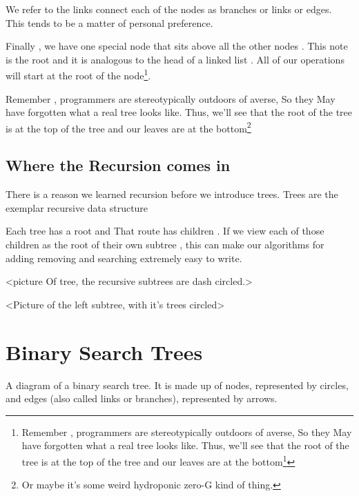 \documentclass[10pt,a4paper]{book}
\begin{document}
We refer to the links connect each of the nodes as branches or links or edges.  This tends to be a matter of personal preference.



Finally , we have one special node that sits above all the other nodes . This note is the root and it is analogous to the head of a linked list . All of our operations will start at the root of the node\footnote{Remember , programmers are stereotypically outdoors of averse, So they May have forgotten what a real tree looks like.  Thus, we'll see that the root of the tree is at the top of the tree and our leaves are at the bottom\footnote{Or maybe it's some weird hydroponic zero-G kind of thing.}}.


Remember , programmers are stereotypically outdoors of averse, So they May have forgotten what a real tree looks like.  Thus, we'll see that the root of the tree is at the top of the tree and our leaves are at the bottom\footnote{Or maybe it's some weird hydroponic zero-G kind of thing.}


\subsection{Where the  Recursion comes in}
There is a reason we learned recursion before we introduce trees. Trees are the exemplar recursive data structure

Each tree has a root and That route has children .  If we view each of those children as the root of their own subtree , this can make our algorithms for adding removing and searching extremely easy to write.

<picture Of tree, the recursive subtrees are dash circled.>

<Picture of the left subtree, with it's trees circled>




















\section{Binary Search Trees}

A diagram of a binary search tree.  It is made up of nodes, represented by circles, and edges (also called links or branches), represented by arrows.  
\end{document}
